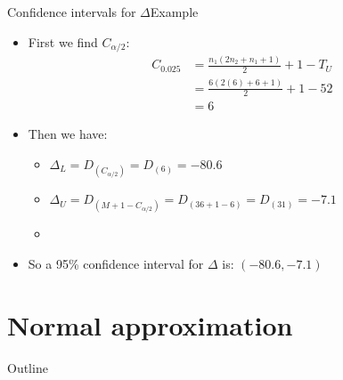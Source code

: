 \documentclass[xcolor=dvipsnames]{beamer}
\begin{document}
\begin{frame}{Confidence intervals for $\Delta$}{Example}
	\begin{itemize}
		\item First we find $C_{\alpha/2}$:
		\begin{align*}
		C_{0.025} &= \frac{n_1 (2n_2 + n_1 + 1)}{2} + 1 - T_U \\
		&= \frac{6 (2(6) + 6 + 1)}{2} + 1 - 52 \\
		&= 6
		\end{align*}
		\item Then we have:
		\begin{itemize}
			\item $\Delta_L = D_{(C_{\alpha / 2})} = D_{(6)} = -80.6$
			\item $\Delta_U = D_{(M + 1 - C_{\alpha / 2})} = D_{(36 +1 - 6)} =D_{(31)} = -7.1$
			\item[]
		\end{itemize}
	\item So a 95\% confidence interval for $\Delta$ is: $(-80.6, -7.1)$
	\end{itemize}
\end{frame}

\section{Normal approximation}

\begin{frame}{Outline}
\tableofcontents[currentsection,subsectionstyle=show/shaded/hide]
\end{frame}
\end{document}
